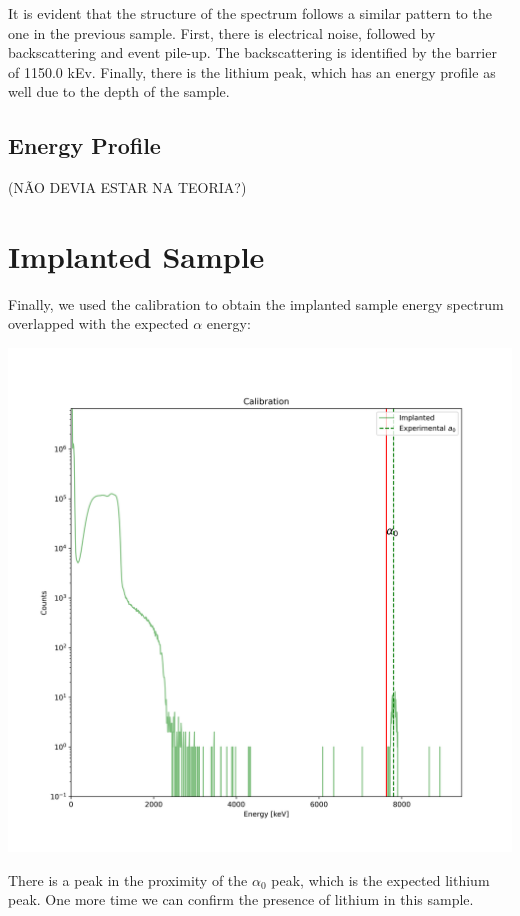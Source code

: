 \documentclass{article}
\begin{document}
\begin{multicols}{2}
It is evident that the structure of the spectrum follows a similar pattern to the one in the previous sample.
First, there is electrical noise, followed by backscattering and event pile-up. 
The backscattering is identified by the barrier of 1150.0 kEv.
Finally, there is the lithium peak, which has an energy profile as well due to the depth of the sample.


\subsection{Energy Profile}

(NÃO DEVIA ESTAR NA TEORIA?)

\section{Implanted Sample}

Finally, we used the calibration to obtain the implanted sample energy spectrum overlapped with the expected $\alpha$ energy:
\begin{center}
    \label{TT_21}
    \centering
    \includegraphics[scale = 0.35]{../../images/OverlapImplanted.png}
\end{center}

There is a peak in the proximity of the $\alpha_0$ peak, which is the expected lithium peak.
One more time we can confirm the presence of lithium in this sample.


\end{multicols}
\end{document}

